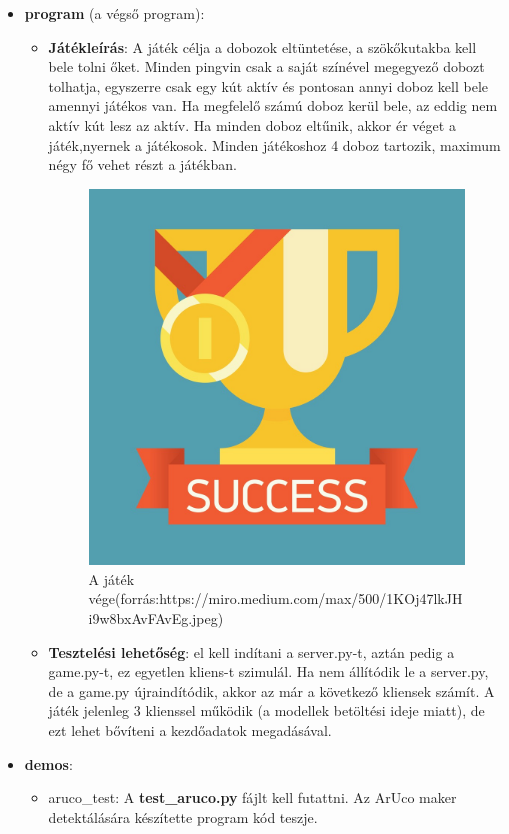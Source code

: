 \begin{itemize}
\item \textbf{program} (a végső program): 
\begin{itemize}
\item \textbf{Játékleírás}: A játék célja a dobozok eltüntetése, a szökőkutakba kell bele tolni őket.
Minden pingvin csak a saját színével megegyező dobozt tolhatja, egyszerre csak egy kút aktív és
pontosan annyi doboz kell bele amennyi játékos van. Ha megfelelő számú doboz kerül bele, az eddig nem aktív kút lesz az aktív.
Ha minden doboz eltűnik, akkor ér véget a játék,nyernek a játékosok.  
Minden játékoshoz 4 doboz tartozik, maximum négy fő vehet részt a játékban.
\begin{figure}[htp]
    \centering
   	\includegraphics[scale=0.1]{images/win.jpg}
	\caption{A játék vége(forrás:https://miro.medium.com/max/500/1\*KOj47lkJHi9w8bxAvFAvEg.jpeg)}
	\label{fig:win}
\end{figure}
\item \textbf{Tesztelési lehetőség}: el kell indítani a server.py-t, aztán pedig a game.py-t, ez egyetlen kliens-t szimulál.
Ha nem állítódik le a server.py, de a game.py újraindítódik, akkor az már a következő kliensek számít.
A játék jelenleg 3 klienssel működik (a modellek betöltési ideje miatt), de ezt lehet bővíteni a kezdőadatok megadásával.
\end{itemize}
\item \textbf{demos}:
\begin{itemize}
\item aruco\_test:
A \textbf{test\_aruco.py} fájlt kell futattni.
Az ArUco maker detektálására készítette program kód teszje. 


\end{itemize}
\end{itemize}

